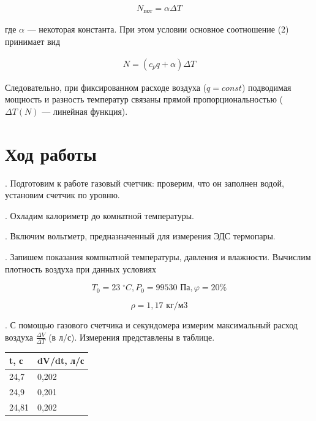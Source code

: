 \documentclass[a4paper,12pt]{article} %
\begin{document}
\begin{equation}
\begin{aligned}
N_{\text{пот}} = \alpha \Delta T
\end{aligned}
\end{equation}

\noindent где $\alpha$ — некоторая константа. При этом условии основное соотношение (2) принимает вид

\begin{equation}
\begin{aligned}
N = (c_p q+ \alpha) \Delta T
\end{aligned}
\end{equation}

\noindent Следовательно, при фиксированном расходе воздуха ($q = const$) подводимая мощность и разность температур связаны прямой пропорциональностью ($\Delta T (N)$ — линейная функция).

\medskip

\section{Ход работы}

\medskip

. Подготовим к работе газовый счетчик: проверим, что он заполнен  водой, установим счетчик по уровню.

\medskip

. Охладим калориметр до комнатной температуры.

\medskip

. Включим вольтметр, предназначенный для измерения ЭДС термопары. 

\medskip

. Запишем показания компнатной температуры, давления и влажности. Вычислим плотность воздуха при данных условиях 

$$T_{0} = 23 \; ^\circ C, P_{0} = 99530 \text{ Па}, \varphi = 20\% $$

$$\rho = 1,17 \text{ кг/м3}$$

. С помощью газового счетчика и секундомера измерим максимальный расход воздуха $\frac{\Delta V}{\Delta T}$ (в л/с). Измерения представлены в таблице. 

\begin{table}[h!]
\begin{tabular}{|l|l|}
\hline
t, с  & dV/dt, л/с \\ \hline
24,7  & 0,202      \\ \hline
24,9  & 0,201      \\ \hline
24,81 & 0,202      \\ \hline
\end{tabular}
\end{table}
\end{document}
